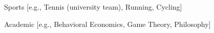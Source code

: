 

\begin{cvskills}

  \cvskill
    {Sports} %
    {[e.g., Tennis (university team), Running, Cycling]} %

  \cvskill
    {Academic} %
    {[e.g., Behavioral Economics, Game Theory, Philosophy]} %

\end{cvskills}
